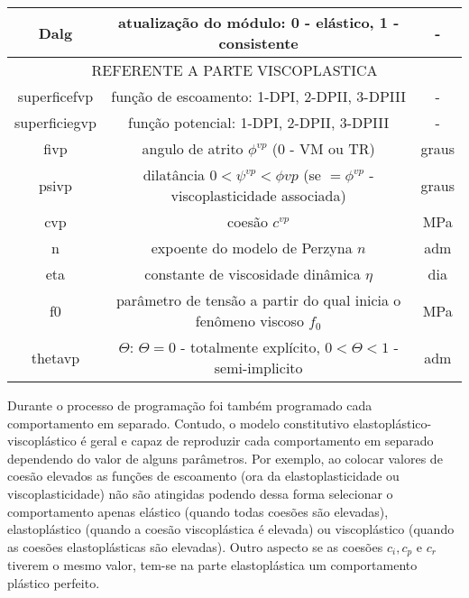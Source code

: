 \begin{table}[H]
\begin{tabular}{c c c}
		Dalg & atualização do módulo: 0 - elástico, 1 - consistente & - \\					
		\hline
		\multicolumn{3}{c}{REFERENTE A PARTE VISCOPLASTICA} \\
		\hline
		superficefvp & função de escoamento: 1-DPI, 2-DPII, 3-DPIII  & - \\
		superficiegvp & função potencial: 1-DPI, 2-DPII, 3-DPIII & - \\
		fivp & angulo de atrito $\phi^{vp}$ (0 - VM ou TR) & graus \\
		psivp & dilatância $0<\psi^{vp}<\phi{vp}$ (se $=\phi^{vp}$ - viscoplasticidade associada) & graus \\
		cvp & coesão $c^{vp}$ & MPa \\
		n & expoente do modelo de Perzyna $n$ & adm \\
		eta & constante de viscosidade dinâmica $\eta$ & dia \\
		f0 & parâmetro de tensão a partir do qual inicia o fenômeno viscoso $f_0$ & MPa \\
		thetavp & $\Theta$: $\Theta=0$ - totalmente explícito, $0<\Theta<1$ - semi-implicito & adm \\
		\hline
	\end{tabular}
	\normalsize
\end{table}
Durante o processo de programação foi também programado cada comportamento em separado. Contudo, o modelo constitutivo elastoplástico-viscoplástico é geral e capaz de reproduzir cada comportamento em separado dependendo do valor de alguns parâmetros. Por exemplo, ao colocar valores de coesão elevados as funções de escoamento (ora da elastoplasticidade ou viscoplasticidade) não são atingidas podendo dessa forma selecionar o comportamento apenas elástico (quando todas coesões são elevadas), elastoplástico (quando a coesão viscoplástica é elevada) ou viscoplástico (quando as coesões elastoplásticas são elevadas). Outro aspecto se as coesões $c_i, c_p$ e $c_r$ tiverem o mesmo valor, tem-se na parte elastoplástica um comportamento plástico perfeito.


